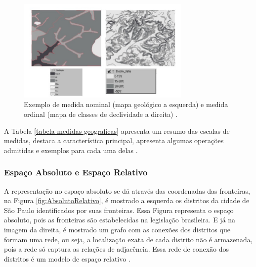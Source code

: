 \newpage

\begin{figure}[h]
\centering
\includegraphics[width=0.75\textwidth]{./img/cap_II/2-TeoriaMedida}
\caption{Exemplo de medida nominal (mapa geológico a esquerda) e medida ordinal (mapa de classes de declividade a direita) \cite{queirozferreira}.}
\label{fig:TeoriaMedida}
\end{figure}

A Tabela \ref{tabela-medidas-geograficas} apresenta um resumo das escalas de medidas, destaca a característica principal, apresenta algumas operações admitidas e exemplos para cada uma delas \cite{queirozferreira}.

\begin{table}[htb]
\end{table}

\subsubsection{Espaço Absoluto e Espaço Relativo}

A representação no espaço absoluto se dá através das coordenadas das fronteiras, na Figura \ref{fig:AbsolutoRelativo}, é mostrado a esquerda os distritos da cidade de São Paulo identificados por suas fronteiras. Essa Figura representa o espaço absoluto, pois as fronteiras são estabelecidas na legislação brasileira. E já na imagem da direita, é mostrado um grafo com as conexões dos distritos que formam uma rede, ou seja, a localização exata de cada distrito não é armazenada, pois a rede só captura as relações de adjacência. Essa rede de conexão dos distritos é um modelo de espaço relativo \cite{queirozferreira}.

